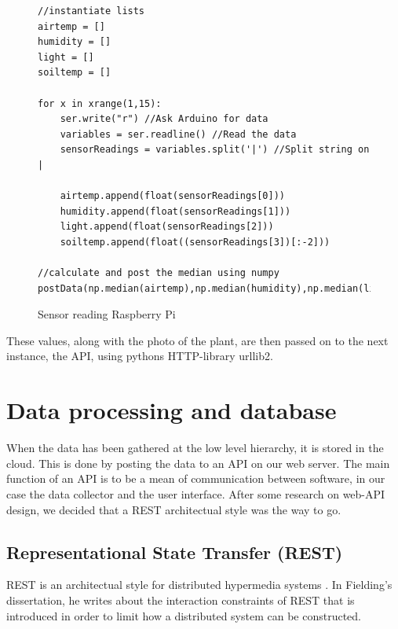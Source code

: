 \lstset{language=Python} 
\begin{figure}
\begin{lstlisting}
//instantiate lists
airtemp = []
humidity = []
light = []
soiltemp = [] 

for x in xrange(1,15): 
	ser.write("r") //Ask Arduino for data
	variables = ser.readline() //Read the data
	sensorReadings = variables.split('|') //Split string on |

	airtemp.append(float(sensorReadings[0]))
	humidity.append(float(sensorReadings[1]))
	light.append(float(sensorReadings[2]))
	soiltemp.append(float((sensorReadings[3])[:-2])) 

//calculate and post the median using numpy
postData(np.median(airtemp),np.median(humidity),np.median(light),np.median(soiltemp)) 
\end{lstlisting}
\caption{Sensor reading Raspberry Pi}
\label{fig:raspberrycode}
\end{figure}

These values, along with the photo of the plant, are then passed on to the next instance, the API, using pythons HTTP-library urllib2. 

\section{Data processing and database}
When the data has been gathered at the low level hierarchy, it is stored in the cloud. This is done by posting the data to an API on our web server. The main function of an API is to be a mean of communication between software, in our case the data collector and the user interface. After some research on web-API design, we decided that a REST architectual style was the way to go. 

\subsection{Representational State Transfer (REST)}
REST is an architectual style for distributed hypermedia systems \citep{fielding2000architectural}. In Fielding's dissertation, he writes about the interaction constraints of REST that is introduced in order to limit how a distributed system can be constructed. 

